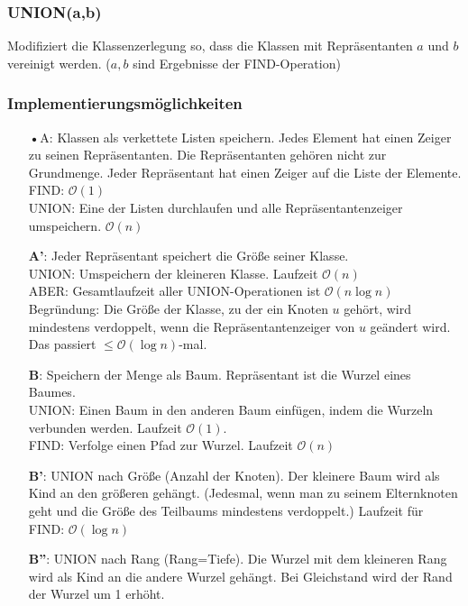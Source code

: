 \subsubsection{UNION(a,b)}
Modifiziert die Klassenzerlegung so, dass die Klassen mit Repräsentanten $a$ und $b$ vereinigt werden. ($a,b$ sind Ergebnisse der FIND-Operation)\\
\subsubsection{Implementierungsmöglichkeiten}
\begin{enumerate}
\item[\textbf{•}A:] Klassen als verkettete Listen speichern. Jedes Element hat einen Zeiger zu seinen Repräsentanten. Die Repräsentanten gehören nicht zur Grundmenge. Jeder Repräsentant hat einen Zeiger auf die Liste der Elemente.\\
FIND: $\mathcal{O}(1)$\\
UNION: Eine der Listen durchlaufen und alle Repräsentantenzeiger umspeichern. $\mathcal{O}(n)$\\
\item[\textbf{A'}:] Jeder Repräsentant speichert die Größe seiner Klasse.\\
UNION: Umspeichern der kleineren Klasse. Laufzeit $\mathcal{O}(n)$\\
ABER: Gesamtlaufzeit aller UNION-Operationen ist $\mathcal{O}(n \log n)$\\
Begründung: Die Größe der Klasse, zu der ein Knoten $u$ gehört, wird mindestens verdoppelt, wenn die Repräsentantenzeiger von $u$ geändert wird. Das passiert $\leq \mathcal{O}(\log n)$-mal.
\item[\textbf{B}:] Speichern der Menge als Baum. Repräsentant ist die Wurzel eines Baumes.\\
UNION: Einen Baum in den anderen Baum einfügen, indem die Wurzeln verbunden werden. Laufzeit $\mathcal{O}(1)$.\\
FIND: Verfolge einen Pfad zur Wurzel. Laufzeit $\mathcal{O}(n)$\\
\item[\textbf{B'}:] UNION nach Größe (Anzahl der Knoten). Der kleinere Baum wird als Kind an den größeren gehängt. (Jedesmal, wenn man zu seinem Elternknoten geht und die Größe des Teilbaums mindestens verdoppelt.) Laufzeit für FIND: $\mathcal{O}(\log n)$
\item[\textbf{B''}:] UNION nach Rang (Rang=Tiefe). Die Wurzel mit dem kleineren Rang wird als Kind an die andere Wurzel gehängt. Bei Gleichstand wird der Rand der Wurzel um 1 erhöht.\\

\end{enumerate}
